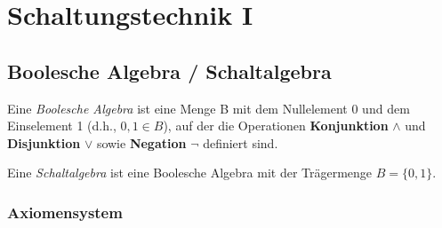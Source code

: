 \documentclass[12pt]{report}
\begin{document}
\tableofcontents

\chapter{Schaltungstechnik I}

\section{Boolesche Algebra / Schaltalgebra}

\begin{defbox}
  Eine \textit{Boolesche Algebra} ist eine Menge B mit dem Nullelement 0 und dem
  Einselement 1 (d.h., $0, 1 \in B$), auf der die Operationen \textbf{Konjunktion} $\wedge$ und  \textbf{Disjunktion} $\vee$ sowie \textbf{Negation} $\neg$ definiert sind.
\end{defbox}

\begin{defbox}[Schaltalgebra]
  Eine \textit{Schaltalgebra} ist eine Boolesche Algebra mit der Trägermenge $B=\{0,1\}$.
\end{defbox}

\subsection{Axiomensystem}
\end{document}
